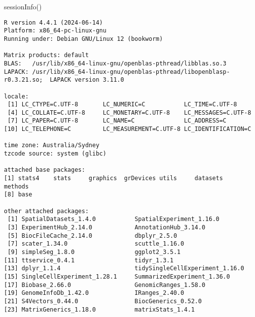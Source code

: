 \documentclass[
  letterpaper,
  DIV=11,
  numbers=noendperiod]{scrreprt}
\newenvironment{Shaded}{\begin{snugshade}}{\end{snugshade}}
\newcommand{\FunctionTok}[1]{\textcolor[rgb]{0.28,0.35,0.67}{#1}}
\newcommand{\NormalTok}[1]{\textcolor[rgb]{0.00,0.23,0.31}{#1}}
\begin{document}
\begin{Shaded}
\begin{Highlighting}[]
\FunctionTok{sessionInfo}\NormalTok{()}
\end{Highlighting}
\end{Shaded}

\begin{verbatim}
R version 4.4.1 (2024-06-14)
Platform: x86_64-pc-linux-gnu
Running under: Debian GNU/Linux 12 (bookworm)

Matrix products: default
BLAS:   /usr/lib/x86_64-linux-gnu/openblas-pthread/libblas.so.3 
LAPACK: /usr/lib/x86_64-linux-gnu/openblas-pthread/libopenblasp-r0.3.21.so;  LAPACK version 3.11.0

locale:
 [1] LC_CTYPE=C.UTF-8       LC_NUMERIC=C           LC_TIME=C.UTF-8       
 [4] LC_COLLATE=C.UTF-8     LC_MONETARY=C.UTF-8    LC_MESSAGES=C.UTF-8   
 [7] LC_PAPER=C.UTF-8       LC_NAME=C              LC_ADDRESS=C          
[10] LC_TELEPHONE=C         LC_MEASUREMENT=C.UTF-8 LC_IDENTIFICATION=C   

time zone: Australia/Sydney
tzcode source: system (glibc)

attached base packages:
[1] stats4    stats     graphics  grDevices utils     datasets  methods  
[8] base     

other attached packages:
 [1] SpatialDatasets_1.4.0           SpatialExperiment_1.16.0       
 [3] ExperimentHub_2.14.0            AnnotationHub_3.14.0           
 [5] BiocFileCache_2.14.0            dbplyr_2.5.0                   
 [7] scater_1.34.0                   scuttle_1.16.0                 
 [9] simpleSeg_1.8.0                 ggplot2_3.5.1                  
[11] ttservice_0.4.1                 tidyr_1.3.1                    
[13] dplyr_1.1.4                     tidySingleCellExperiment_1.16.0
[15] SingleCellExperiment_1.28.1     SummarizedExperiment_1.36.0    
[17] Biobase_2.66.0                  GenomicRanges_1.58.0           
[19] GenomeInfoDb_1.42.0             IRanges_2.40.0                 
[21] S4Vectors_0.44.0                BiocGenerics_0.52.0            
[23] MatrixGenerics_1.18.0           matrixStats_1.4.1              


\end{verbatim}
\end{document}
